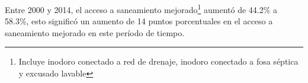  Entre 2000 y 2014, el acceso a saneamiento mejorado\footnote{Incluye inodoro conectado a red de drenaje, inodoro conectado a fosa séptica y excusado lavable} aumentó de 44.2\% a 58.3\%, esto significó un aumento de  14 puntos porcentuales  en el acceso a saneamiento mejorado en este período de tiempo.
